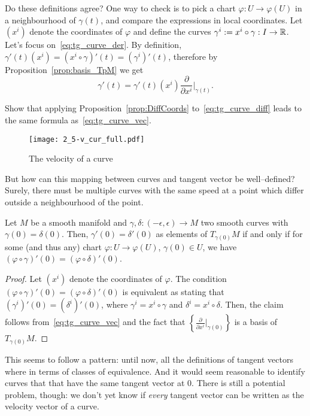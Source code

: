 Do these definitions agree?
One way to check is to pick a chart $\varphi: U \to \varphi(U)$ in a neighbourhood of $\gamma(t)$, and compare the expressions in local coordinates. Let $(x^i)$ denote the coordinates of $\varphi$ and define the curves $\gamma^i := x^i \circ \gamma : I\to\mathbb{R}$.
Let's focus on~\eqref{eq:tg_curve_der}. By definition, $\gamma'(t)(x^i) = (x^i\circ\gamma)'(t) = (\gamma^i)'(t)$, therefore by Proposition~\ref{prop:basis_TpM} we get
\begin{equation}\label{eq:tg_curve_vec}
  \gamma'(t) = %
    \gamma'(t)(x^i) \frac{\partial}{\partial x^i}\Big|_{\gamma(t)}.
\end{equation}
\begin{exercise}
  Show that applying Proposition~\ref{prop:DiffCoords} to~\eqref{eq:tg_curve_diff} leads to the same formula as~\eqref{eq:tg_curve_vec}.
\end{exercise}

\begin{figure*}[htp]
  \centering
  \texttt{[image: 2\_5-v\_cur\_full.pdf]}
  \caption{The velocity of a curve}
  \label{fig:2_5-v_cur_full}
\end{figure*}

But how can this mapping between curves and tangent vector be well--defined?
Surely, there must be multiple curves with the same speed at a point which differ outside a neighbourhood of the point.

\begin{lemma}\label{lem:equiv_tg_curves}
  Let $M$ be a smooth manifold and $\gamma, \delta : (-\epsilon, \epsilon) \to M$ two smooth curves with $\gamma(0) = \delta(0)$. Then, $\gamma'(0) = \delta'(0)$ as elements of $T_{\gamma(0)}M$ if and only if for some (and thus any) chart $\varphi:U\to\varphi(U)$, $\gamma(0)\in U$, we have $(\varphi\circ \gamma)'(0) = (\varphi\circ\delta)'(0)$.
\end{lemma}
\begin{proof}
  Let $(x^i)$ denote the coordinates of $\varphi$. The condition $(\varphi\circ \gamma)'(0) = (\varphi\circ\delta)'(0)$ is equivalent as stating that $(\gamma^i)'(0) = (\delta^i)'(0)$, where $\gamma^i = x^i\circ\gamma$ and $\delta^i=x^i\circ\delta$. Then, the claim follows from~\eqref{eq:tg_curve_vec} and the fact that $\left\{\frac{\partial}{\partial x^i}\big|_{\gamma(0)}\right\}$ is a basis of $T_{\gamma(0)}M$.
\end{proof}

This seems to follow a pattern: until now, all the definitions of tangent vectors where in terms of classes of equivalence.
And it would seem reasonable to identify curves that that have the same tangent vector at $0$.
There is still a potential problem, though: we don't yet know if \emph{every} tangent vector can be written as the velocity vector of a curve.

